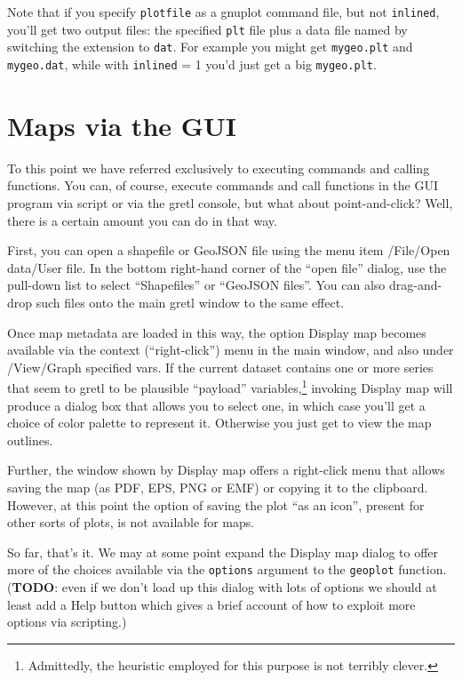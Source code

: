 \documentclass{article}
\begin{document}
Note that if you specify \texttt{plotfile} as a \textsf{gnuplot}
command file, but not \texttt{inlined}, you'll get two output files:
the specified \texttt{plt} file plus a data file named by switching
the extension to \texttt{dat}. For example you might get
\texttt{mygeo.plt} and \texttt{mygeo.dat}, while with \texttt{inlined}
= 1 you'd just get a big \texttt{mygeo.plt}.

\section{Maps via the GUI}
\label{sec:gui}

To this point we have referred exclusively to executing commands and
calling functions. You can, of course, execute commands and call
functions in the GUI program via script or via the gretl console, but
what about point-and-click? Well, there is a certain amount you can do
in that way.

First, you can open a shapefile or GeoJSON file using the menu item
\textsf{/File/Open data/User file}. In the bottom right-hand corner of
the ``open file'' dialog, use the pull-down list to select
``Shapefiles'' or ``GeoJSON files''. You can also drag-and-drop such
files onto the main gretl window to the same effect.

Once map metadata are loaded in this way, the option \textsf{Display
  map} becomes available via the context (``right-click'') menu in the
main window, and also under \textsf{/View/Graph specified vars}. If
the current dataset contains one or more series that seem to gretl to
be plausible ``payload'' variables,\footnote{Admittedly, the heuristic
  employed for this purpose is not terribly clever.} invoking
\textsf{Display map} will produce a dialog box that allows you to
select one, in which case you'll get a choice of color palette to
represent it. Otherwise you just get to view the map outlines.

Further, the window shown by \textsf{Display map} offers a right-click
menu that allows saving the map (as PDF, EPS, PNG or EMF) or copying
it to the clipboard. However, at this point the option of saving the
plot ``as an icon'', present for other sorts of plots, is not
available for maps.

So far, that's it. We may at some point expand the \textsf{Display
  map} dialog to offer more of the choices available via the
\texttt{options} argument to the \texttt{geoplot}
function. (\textbf{TODO}: even if we don't load up this dialog with
lots of options we should at least add a \textsf{Help} button which
gives a brief account of how to exploit more options via scripting.)
\end{document}
